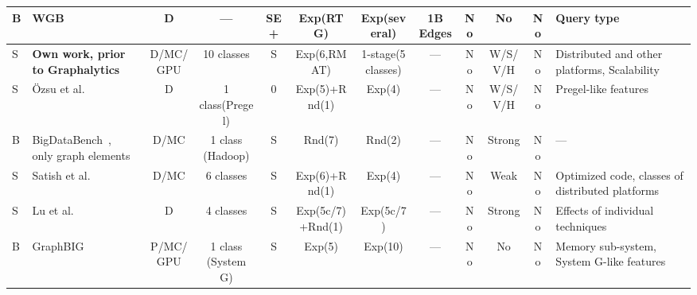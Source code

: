 \begin{tabular}[!tb]{|l|l|l|l|l|l|l|l|l|l|l|l|}
\hline
B & WGB~\cite{DBLP:conf/wbdb/AmmarO13} & \multicolumn{1}{c|}{D} & \multicolumn{1}{c|}{---} & \multicolumn{1}{c|}{SE+} & \multicolumn{1}{c|}{Exp(RTG)} & \multicolumn{1}{c|}{Exp(several)} & \multicolumn{1}{c|}{1B Edges} & \multicolumn{1}{c|}{No} & \multicolumn{1}{c|}{No} & \multicolumn{1}{c|}{No} & Query type \\ 
\hline
S & {\bf Own work, prior to Graphalytics}~\cite{DBLP:conf/ipps/GuoBVIMW14,DBLP:conf/ccgrid/GuoVIE15,DBLP:conf/sigmod/CapotaHIPEB14} & \multicolumn{1}{c|}{D/MC/GPU} & \multicolumn{1}{c|}{10 classes} & \multicolumn{1}{c|}{S} & \multicolumn{1}{c|}{Exp(6,RMAT)} & \multicolumn{1}{c|}{1-stage(5 classes)} & \multicolumn{1}{c|}{---} & \multicolumn{1}{c|}{No} & \multicolumn{1}{c|}{W/S/V/H} & \multicolumn{1}{c|}{No} & Distributed and other platforms, Scalability \\ 
\hline
S & \"Ozsu et al.~\cite{DBLP:journals/pvldb/HanDAOWJ14} & \multicolumn{1}{c|}{D} & \multicolumn{1}{c|}{1 class(Pregel)} & \multicolumn{1}{c|}{0} & \multicolumn{1}{c|}{Exp(5)+Rnd(1)} & \multicolumn{1}{c|}{Exp(4)} & \multicolumn{1}{c|}{---} & \multicolumn{1}{c|}{No} & \multicolumn{1}{c|}{W/S/V/H} & \multicolumn{1}{c|}{No} & Pregel-like features \\ 
\hline
B & \pbox{5cm}{BigDataBench~\cite{DBLP:conf/wbdb/MingLGHYWZ13,DBLP:conf/hpca/WangZLZYHGJSZZLZLQ14}, \\only graph elements} & \multicolumn{1}{c|}{D/MC} & \multicolumn{1}{c|}{1 class (Hadoop)} & \multicolumn{1}{c|}{S} & \multicolumn{1}{c|}{Rnd(7)} & \multicolumn{1}{c|}{Rnd(2)} & \multicolumn{1}{c|}{---} & \multicolumn{1}{c|}{No} & \multicolumn{1}{c|}{Strong} & \multicolumn{1}{c|}{No} & --- \\ 
\hline
S & Satish et al.~\cite{DBLP:conf/sigmod/SatishSPSPHSYD14} & \multicolumn{1}{c|}{D/MC} & \multicolumn{1}{c|}{6 classes} & \multicolumn{1}{c|}{S} & \multicolumn{1}{c|}{Exp(6)+Rnd(1)} & \multicolumn{1}{c|}{Exp(4)} & \multicolumn{1}{c|}{---} & \multicolumn{1}{c|}{No} & \multicolumn{1}{c|}{Weak} & \multicolumn{1}{c|}{No} & Optimized code, classes of distributed platforms \\ 
\hline
S & Lu et al.~\cite{DBLP:journals/pvldb/LuCYW14} & \multicolumn{1}{c|}{D} & \multicolumn{1}{c|}{4 classes} & \multicolumn{1}{c|}{S} & \multicolumn{1}{c|}{Exp(5c/7)+Rnd(1)} & \multicolumn{1}{c|}{Exp(5c/7)} & \multicolumn{1}{c|}{---} & \multicolumn{1}{c|}{No} & \multicolumn{1}{c|}{Strong} & \multicolumn{1}{c|}{No} & Effects of individual techniques \\ 
\hline
B & GraphBIG~\cite{DBLP:conf/sc/NaiXTKL15} & \multicolumn{1}{c|}{P/MC/GPU} & \multicolumn{1}{c|}{1 class (System G)} & \multicolumn{1}{c|}{S} & \multicolumn{1}{c|}{Exp(5)} & \multicolumn{1}{c|}{Exp(10)} & \multicolumn{1}{c|}{---} & \multicolumn{1}{c|}{No} & \multicolumn{1}{c|}{No} & \multicolumn{1}{c|}{No} & Memory sub-system, System G-like features \\ 

\end{tabular}
